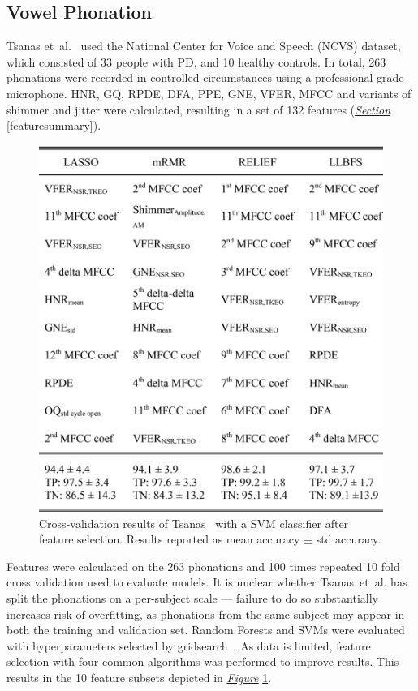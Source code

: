 \documentclass[12pt, twoside]{book}
\begin{document}
\subsection{Vowel Phonation}
\label{phonationpast}
Tsanas et~al.~\cite{tsanas2012novel} used the National Center for Voice and Speech (NCVS) dataset, which consisted of 33 people with PD, and 10 healthy controls. In total, 263 phonations were recorded in controlled circumstances using a professional grade microphone. HNR, GQ, RPDE, DFA, PPE, GNE, VFER, MFCC and variants of shimmer and jitter were calculated, resulting in a set of 132 features (\textit{\hyperref[featuresummary]{Section}} \ref{featuresummary}).


\begin{figure}[!htb]
	\caption{Cross-validation results of Tsanas~\cite{tsanas2012novel} with a SVM classifier after feature selection. Results reported as mean accuracy $\pm$ std accuracy.}
	\label{tsanasresults}
	\centering\includegraphics[width=0.75\linewidth]{tsanas.png}
\end{figure}

Features were calculated on the 263 phonations and 100 times repeated 10 fold cross validation used to evaluate models. It is unclear whether Tsanas~et~al. has split the phonations on a per-subject scale --- failure to do so substantially increases risk of overfitting, as phonations from the same subject may appear in both the training and validation set. Random Forests and SVMs were evaluated with hyperparameters selected by gridsearch~\cite{gridsearch}. As data is limited, feature selection with four common algorithms was performed to improve results. This results in the 10 feature subsets depicted in \textit{\hyperref[tsanasresults]{Figure}} \ref{tsanasresults}.
\end{document}
